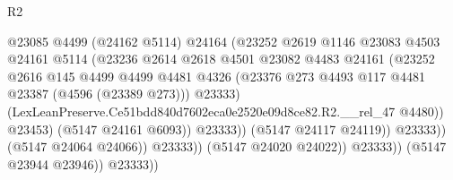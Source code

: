 \begin{lexlean}{R2}
\begin{coremodule}
                                              @23085
                                              @4499
                                              (@24162 @5114)
                                              @24164
                                              (@23252
                                                @2619
                                                @1146
                                                @23083
                                                @4503
                                                @24161
                                                @5114
                                                (@23236
                                                  @2614
                                                  @2618
                                                  @4501
                                                  @23082
                                                  @4483
                                                  @24161
                                                  (@23252
                                                    @2616
                                                    @145
                                                    @4499
                                                    @4499
                                                    @4481
                                                    @4326
                                                    (@23376
                                                      @273
                                                      @4493
                                                      @117
                                                      @4481
                                                      @23387
                                                      (@4596 (@23389 @273)))
                                                    @23333)
                                                  (LexLeanPreserve.Ce51bdd840d7602eca0e2520e09d8ce82.R2.__rel_47
                                                    @4480))
                                                @23453)
                                              (@5147 @24161 @6093))
                                            @23333))
                                        (@5147 @24117 @24119))
                                      @23333))
                                  (@5147 @24064 @24066))
                                @23333))
                            (@5147 @24020 @24022))
                          @23333))
                      (@5147 @23944 @23946))
                    @23333))

\end{coremodule}
\end{lexlean}
